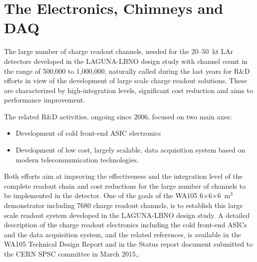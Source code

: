 \section{The Electronics, Chimneys and DAQ}
\label{sec:detectors-fd-alt-elec}

The large number of charge readout channels, needed for the 20--50~kt
LAr detectors developed in the LAGUNA-LBNO design study with channel
count in the range of 500,000 to 1,000,000, naturally called during
the last years for R\&D efforts in view of the development of large
scale charge readout solutions. These are characterized by
high-integration levels, significant cost reduction and aims to
performance improvement.

The related R\&D activities, ongoing since 2006, focused on two main axes:
\begin {itemize} 
\item{Development of cold front-end ASIC electronics}
\item{Development of low cost, largely scalable, data 
acquisition system based on modern telecommunication technologies.}
\end{itemize}

Both efforts aim at improving the effectiveness and the integration
level of the complete readout chain and cost reductions for the large
number of channels to be implemented in the detector. One of the goals
of the WA105 6$\times$6$\times$6~m$^3$ demonstrator including 7680
charge readout channels, is to establish this large scale readout
system developed in the LAGUNA-LBNO design study. A detailed
description of the charge readout electronics including the cold
front-end ASICs and the data acquisition system, and the related
references, is available in the WA105 Technical Design Report and in
the Status report document submitted to the CERN SPSC committee in
March 2015\cite{WA105_TDR},\cite{WA105_SREP}.

